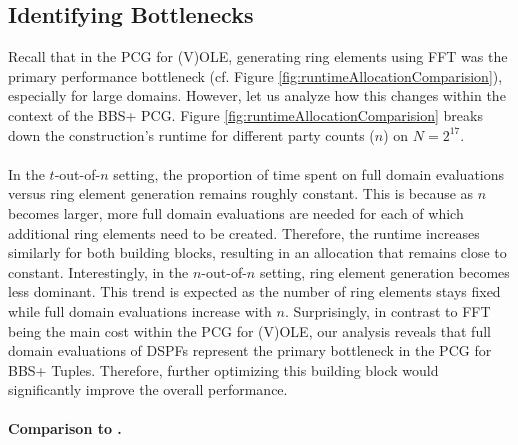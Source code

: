\subsection{Identifying Bottlenecks}
\label{subsec:bbspPcgBottlenecks}
Recall that in the PCG for (V)OLE, generating ring elements using FFT was the primary performance bottleneck (cf. Figure \ref{fig:runtimeAllocationComparision}), especially for large domains. However, let us analyze how this changes within the context of the BBS+ PCG. Figure \ref{fig:runtimeAllocationComparision} breaks down the construction's runtime for different party counts ($n$) on $N=2^{17}$.
\\\\
In the $t$-out-of-$n$ setting, the proportion of time spent on full domain evaluations versus ring element generation remains roughly constant. This is because as $n$ becomes larger, more full domain evaluations are needed for each of which additional ring elements need to be created. Therefore, the runtime increases similarly for both building blocks, resulting in an allocation that remains close to constant. Interestingly, in the $n$-out-of-$n$ setting, ring element generation becomes less dominant. This trend is expected as the number of ring elements stays fixed while full domain evaluations increase with $n$. Surprisingly, in contrast to FFT being the main cost within the PCG for (V)OLE, our analysis reveals that full domain evaluations of DSPFs represent the primary bottleneck in the PCG for BBS+ Tuples. Therefore, further optimizing this building block would significantly improve the overall performance.
\\\\
\textbf{Comparison to \cite{abram2022low}.}
